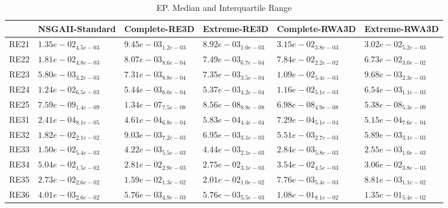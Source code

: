 \documentclass{article}
\begin{document}
\begin{table}
\caption{EP. Median and Interquartile Range}
\label{table: EP}
\centering
\begin{scriptsize}
\begin{tabular}{llllll}
\hline & NSGAII-Standard & Complete-RE3D & Extreme-RE3D & Complete-RWA3D &  Extreme-RWA3D\\
\hline 
RE21 & $  1.35e-02_{ 4.5e-03}$ & \cellcolor{gray25}$  9.45e-03_{ 1.2e-03}$ & \cellcolor{gray95}$  8.92e-03_{ 1.0e-03}$ & $  3.15e-02_{ 3.8e-03}$ & $  3.02e-02_{ 5.2e-03}$ \\
RE22 & $  1.81e-02_{ 4.8e-03}$ & \cellcolor{gray25}$  8.07e-03_{ 8.6e-04}$ & \cellcolor{gray95}$  7.49e-03_{ 6.7e-04}$ & $  7.84e-02_{ 2.2e-02}$ & $  6.73e-02_{ 3.0e-02}$ \\
RE23 & \cellcolor{gray95}$  5.80e-03_{ 3.2e-03}$ & \cellcolor{gray25}$  7.31e-03_{ 8.8e-04}$ & $  7.35e-03_{ 3.5e-04}$ & $  1.09e-02_{ 5.4e-03}$ & $  9.68e-03_{ 2.3e-03}$ \\
RE24 & $  1.24e-02_{ 6.5e-03}$ & \cellcolor{gray25}$  5.44e-03_{ 6.0e-04}$ & \cellcolor{gray95}$  5.37e-03_{ 4.2e-04}$ & $  1.16e-02_{ 5.1e-03}$ & $  6.54e-03_{ 1.1e-03}$ \\
RE25 & \cellcolor{gray95}$  7.59e-09_{ 1.4e-09}$ & $  1.34e-07_{ 7.5e-08}$ & $  8.56e-08_{ 8.8e-08}$ & $  6.98e-08_{ 4.9e-08}$ & \cellcolor{gray25}$  5.38e-08_{ 5.3e-09}$ \\
RE31 & \cellcolor{gray95}$  2.41e-04_{ 8.1e-05}$ & \cellcolor{gray25}$  4.61e-04_{ 6.8e-04}$ & $  5.83e-04_{ 4.4e-04}$ & $  7.29e-04_{ 5.1e-04}$ & $  5.15e-04_{ 7.6e-04}$ \\
RE32 & $  1.82e-02_{ 2.1e-02}$ & $  9.03e-03_{ 7.2e-03}$ & $  6.95e-03_{ 3.1e-03}$ & \cellcolor{gray95}$  5.51e-03_{ 2.7e-03}$ & \cellcolor{gray25}$  5.89e-03_{ 3.1e-03}$ \\
RE33 & $  1.50e-02_{ 5.4e-03}$ & $  4.22e-03_{ 5.5e-03}$ & $  4.44e-03_{ 2.1e-03}$ & \cellcolor{gray25}$  2.84e-03_{ 5.8e-03}$ & \cellcolor{gray95}$  2.55e-03_{ 1.0e-03}$ \\
RE34 & $  5.04e-02_{ 1.5e-02}$ & \cellcolor{gray25}$  2.81e-02_{ 2.9e-03}$ & \cellcolor{gray95}$  2.75e-02_{ 3.1e-03}$ & $  3.54e-02_{ 4.5e-03}$ & $  3.06e-02_{ 3.8e-03}$ \\
RE35 & $  2.73e-02_{ 2.6e-02}$ & $  1.59e-02_{ 1.3e-02}$ & $  2.01e-02_{ 1.0e-02}$ & \cellcolor{gray95}$  7.76e-03_{ 5.4e-03}$ & \cellcolor{gray25}$  8.81e-03_{ 1.1e-02}$ \\
RE36 & \cellcolor{gray95}$  4.01e-03_{ 2.6e-02}$ & \cellcolor{gray25}$  5.76e-03_{ 4.9e-03}$ & $  5.76e-03_{ 5.5e-03}$ & $  1.08e-01_{ 8.1e-02}$ & $  1.35e-01_{ 5.4e-02}$ \\

\end{tabular}
\end{scriptsize}
\end{table}
\end{document}
